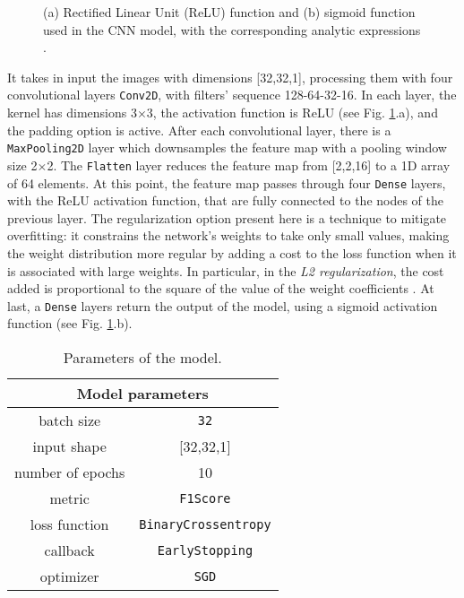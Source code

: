\begin{figure}[h!]
    \centering
    \hfil
    \caption{(a) Rectified Linear Unit (ReLU) function and (b) sigmoid function used in the CNN model, with the corresponding analytic expressions \cite{activ-func}.}
    \label{fig:activ-func}
\end{figure}

It takes in input the images with dimensions [32,32,1], processing them with four convolutional layers \texttt{Conv2D}, with filters' sequence 128-64-32-16. In each layer, the kernel has dimensions 3$\times$3, the activation function is ReLU (see Fig. \ref{fig:activ-func}.a), and the padding option is active. After each convolutional layer, there is a \texttt{MaxPooling2D} layer which downsamples the feature map with a pooling window size 2$\times$2. The \texttt{Flatten} layer reduces the feature map from [2,2,16] to a 1D array of 64 elements. At this point, the feature map passes through four \texttt{Dense} layers, with the ReLU activation function, that are fully connected to the nodes of the previous layer. The regularization option present here is a technique to mitigate overfitting: it constrains the network’s weights to take only small values, making the weight distribution more regular by adding a cost to the loss function when it is associated with large weights. In particular, in the \textit{L2 regularization}, the cost added is proportional to the square of the value of the weight coefficients \cite{deep-learn-python}. At last, a \texttt{Dense} layers return the output of the model, using a sigmoid activation function (see Fig. \ref{fig:activ-func}.b). 

\begin{table}
    \centering
    \begin{tabular}{|c|c|}
        \hline
        \multicolumn{2}{|c|}{\textbf{Model parameters}} \\ 
        \hline
        \hline
        batch size & \texttt{32} \\
        \hline
        input shape & [32,32,1]\\
        \hline
        number of epochs & 10\\
        \hline
        metric & \texttt{F1Score}\\
        \hline
        loss function & \texttt{BinaryCrossentropy}\\
        \hline
        callback & \texttt{EarlyStopping}\\
        \hline
        optimizer & \texttt{SGD}\\
        \hline
    \end{tabular}
    \caption{Parameters of the model.}
    \label{tab:model-pars}
\end{table}

